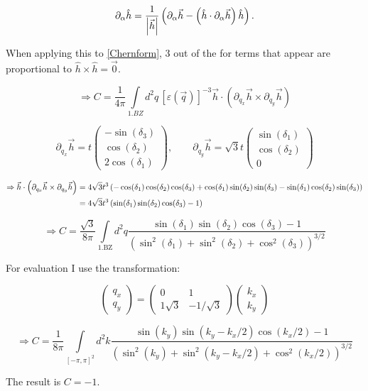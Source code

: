 \documentclass[../../../main.tex]{subfiles}
\begin{document}
\begin{equation}
	\partial_\alpha \hat{h} = \frac{1}{\abs{\vec{h}}}\left(\partial_\alpha\vec{h} - \left(\hat{h}\cdot\partial_\alpha \vec{h}\right)\hat{h}\right).
\end{equation}

When applying this to \ref{Chernform}, 3 out of the for terms that appear are proportional to $\hat{h} \times \hat{h} = \vec{0}$.

\begin{equation}
	\Rightarrow C = \frac{1}{4\pi} \int\limits_{1.BZ}d^2q \, [\varepsilon(\vec{q})]^{-3} \vec{h} \cdot \left( \partial_{q_x}\vec{h} \times \partial_{q_y}\vec{h}\right)
\end{equation}

\begin{equation}
	\partial_{q_x}\vec{h} = t
	\begin{pmatrix}
		-\sin(\delta_3) \\
		\cos(\delta_2) \\
		2\cos(\delta_1)
	\end{pmatrix}, \qquad 
	\partial_{q_y}\vec{h} = \sqrt{3}t
	\begin{pmatrix}
		\sin(\delta_1) \\
		\cos(\delta_2) \\
		0
	\end{pmatrix}
\end{equation}

\begin{align}
	\Rightarrow \vec{h} \cdot \left( \partial_{q_x} \vec{h} \times \partial_{q_y} \vec{h} \right) &= 4 \sqrt{3} t^3\left( -\cos(\delta_1)\cos(\delta_2)\cos(\delta_3) + \cos(\delta_1)\sin(\delta_2)\sin(\delta_3) - \sin(\delta_1)\cos(\delta_2)\sin(\delta_3)\right) \notag \\
	&= 4 \sqrt{3} t^3\left(\sin(\delta_1)\sin(\delta_2)\cos(\delta_3) -1\right)
\end{align}

\begin{equation}
	\Rightarrow C = \frac{\sqrt{3}}{8\pi} \int\limits_{\text{1.BZ}} d^2q \frac{\sin(\delta_1)\sin(\delta_2)\cos(\delta_3)-1}{\left(\sin^2(\delta_1) + \sin^2(\delta_2) + \cos^2(\delta_3)\right)^{3/2}}  
\end{equation}

For evaluation I use the transformation:

\begin{equation}
	\begin{pmatrix}
		q_x \\
		q_y
	\end{pmatrix}=
	\begin{pmatrix}
		0 & 1 \\
		1\sqrt{3} & -1/\sqrt{3}
	\end{pmatrix}
	\begin{pmatrix}
		k_x \\
		k_y
	\end{pmatrix}
\end{equation}

\begin{equation}
	\Rightarrow C = \frac{1}{8\pi} \int\limits_{[-\pi,\pi]^2} d^2k \frac{\sin(k_y)\sin(k_y-k_x/2)\cos(k_x/2)-1}{\left(\sin^2(k_y) + \sin^2(k_y-k_x/2) + \cos^2(k_x/2)\right)^{3/2}}  
\end{equation}

The result is $C=-1$.
\end{document}
